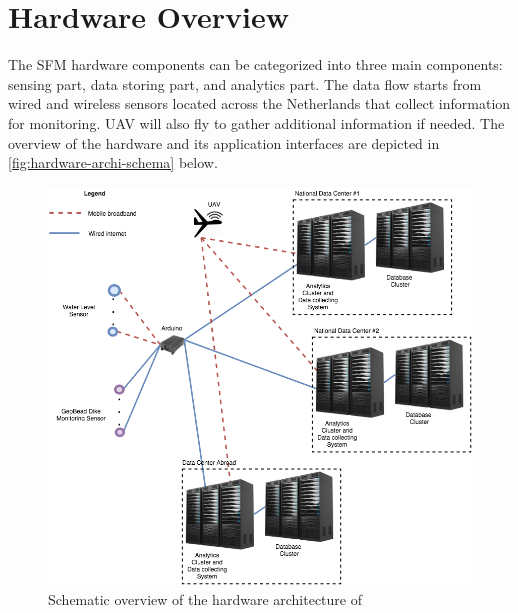 \section{Hardware Overview}
\label{sec:hardware-overview}
The SFM hardware components can be categorized into three main components: sensing part, data storing part, and analytics part. The data flow starts from wired and wireless sensors located across the Netherlands that collect information for monitoring. UAV will also fly to gather additional information if needed. The overview of the hardware and its application interfaces are depicted in \autoref{fig:hardware-archi-schema} below.

\begin{figure}[H]
	\centering
	\includegraphics[scale=0.4]{6-hardware/images/hardwareoverview.png}
	\caption{Schematic overview of the hardware architecture of \ProjectName{}}
	\label{fig:hardware-archi-schema}
\end{figure}

